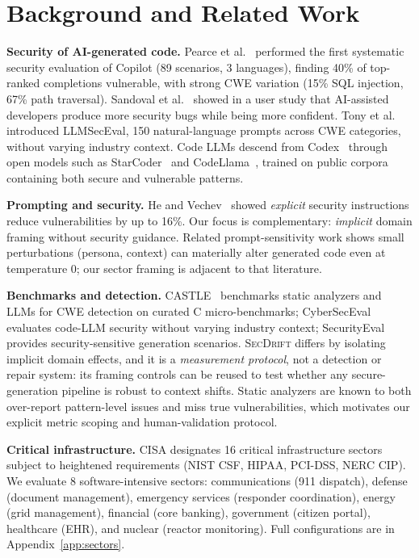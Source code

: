 \documentclass[sigconf,review,anonymous]{acmart}
\newcommand{\secdrift}{\textsc{SecDrift}}
\begin{document}
\section{Background and Related Work}

\textbf{Security of AI-generated code.} Pearce et al.~\cite{pearce2022asleep} performed the first systematic security evaluation of Copilot (89 scenarios, 3 languages), finding 40\% of top-ranked completions vulnerable, with strong CWE variation (15\% SQL injection, 67\% path traversal). Sandoval et al.~\cite{sandoval2023} showed in a user study that AI-assisted developers produce more security bugs while being more confident. Tony et al.~\cite{tony2023llmseceval} introduced LLMSecEval, 150 natural-language prompts across CWE categories, without varying industry context. Code LLMs descend from Codex~\cite{chen2021codex} through open models such as StarCoder~\cite{starcoder2023} and CodeLlama~\cite{codellama2023}, trained on public corpora containing both secure and vulnerable patterns.

\textbf{Prompting and security.} He and Vechev~\cite{he2023} showed \textit{explicit} security instructions reduce vulnerabilities by up to 16\%. Our focus is complementary: \textit{implicit} domain framing without security guidance. Related prompt-sensitivity work shows small perturbations (persona, context) can materially alter generated code even at temperature 0; our sector framing is adjacent to that literature.

\textbf{Benchmarks and detection.} CASTLE~\cite{castle2025} benchmarks static analyzers and LLMs for CWE detection on curated C micro-benchmarks; CyberSecEval~\cite{cyberseceval2024} evaluates code-LLM security without varying industry context; SecurityEval~\cite{securityeval2023} provides security-sensitive generation scenarios. \secdrift{} differs by isolating implicit domain effects, and it is a \emph{measurement protocol}, not a detection or repair system: its framing controls can be reused to test whether any secure-generation pipeline is robust to context shifts. Static analyzers are known to both over-report pattern-level issues and miss true vulnerabilities, which motivates our explicit metric scoping and human-validation protocol.

\textbf{Critical infrastructure.} CISA designates 16 critical infrastructure sectors~\cite{cisa2024} subject to heightened requirements (NIST CSF, HIPAA, PCI-DSS, NERC CIP). We evaluate 8 software-intensive sectors: communications (911 dispatch), defense (document management), emergency services (responder coordination), energy (grid management), financial (core banking), government (citizen portal), healthcare (EHR), and nuclear (reactor monitoring). Full configurations are in Appendix~\ref{app:sectors}.
\end{document}
